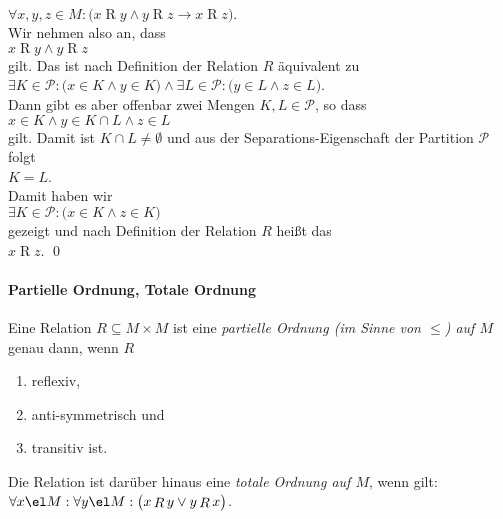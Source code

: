 \begin{enumerate}
      \\[0.2cm]
      \hspace*{1.3cm}
      $\forall x,y,z \in M:\bigl( x \mathop{R} y \wedge y \mathop{R} z \rightarrow x \mathop{R} z\bigr)$.
      \\[0.2cm]
      Wir nehmen also an, dass 
      \\[0.2cm]
      \hspace*{1.3cm}
      $x \mathop{R} y \wedge y \mathop{R} z$
      \\[0.2cm]
      gilt.  Das ist nach Definition der Relation $R$ \"{a}quivalent zu
      \\[0.2cm]
      \hspace*{1.3cm}
      $\exists K \in \mathcal{P}: \bigl(x \in K \wedge y \in K\bigr) \wedge 
       \exists L \in \mathcal{P}: \bigl(y \in L \wedge z \in L\bigr)$.
      \\[0.2cm]
      Dann gibt es aber offenbar zwei Mengen $K,L\in\mathcal{P}$, so dass
      \\[0.2cm]
      \hspace*{1.3cm}
      $x \in K \wedge y \in K \cap L \wedge z \in L$
      \\[0.2cm]
      gilt.  Damit ist $K \cap L \not= \emptyset$ und aus der 
      Separations-Eigenschaft der Partition $\mathcal{P}$ folgt 
      \\[0.2cm]
      \hspace*{1.3cm}
      $K = L$.
      \\[0.2cm]
      Damit haben wir 
      \\[0.2cm]
      \hspace*{1.3cm}
      $\exists K \in \mathcal{P}: \bigl(x \in K \wedge z \in K\bigr)$
      \\[0.2cm]
      gezeigt und nach Definition der Relation $R$ heißt das 
      \\[0.2cm]
      \hspace*{1.3cm}
      $x \mathop{R} z$. 
      \qed
\end{enumerate}

\paragraph{Partielle Ordnung, Totale Ordnung}  \hspace*{\fill} \linebreak
Eine Relation $R \subseteq M \times M$  ist eine 
\emph{partielle Ordnung (im Sinne von $\leq$) auf $M$} genau dann, wenn $R$
\begin{enumerate}
\item reflexiv,
\item anti-symmetrisch und
\item transitiv ist.
\end{enumerate}
Die Relation ist dar\"{u}ber hinaus eine \emph{totale Ordnung auf $M$}, wenn gilt:
\\[0.2cm]
\hspace*{1.3cm} $\forall x \el M : \forall y \el M :\bigl( x\mathop{R}y \vee y \mathop{R} x\bigr)$.

